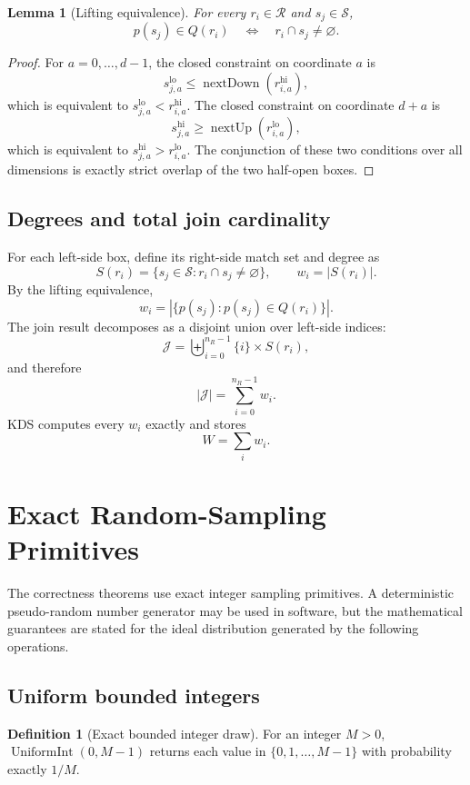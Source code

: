 \documentclass[11pt]{article}
\theoremstyle{definition}
\newtheorem{definition}{Definition}[section]
\theoremstyle{plain}
\newtheorem{lemma}{Lemma}[section]
\theoremstyle{remark}
\DeclareMathOperator{\nextUp}{nextUp}
\DeclareMathOperator{\nextDown}{nextDown}
\DeclareMathOperator{\UniformInt}{UniformInt}
\newcommand{\Rrel}{\mathcal R}
\newcommand{\Srel}{\mathcal S}
\newcommand{\Jset}{\mathcal J}
\newcommand{\lo}{\mathrm{lo}}
\newcommand{\hi}{\mathrm{hi}}
\begin{document}
\begin{lemma}[Lifting equivalence]
For every $r_i\in\Rrel$ and $s_j\in\Srel$,
\[
  p(s_j)\in Q(r_i)
  \quad\Longleftrightarrow\quad
  r_i\cap s_j\neq\varnothing.
\]
\end{lemma}

\begin{proof}
For $a=0,\ldots,d-1$, the closed constraint on coordinate $a$ is
\[
  s_{j,a}^{\lo}\le\nextDown(r_{i,a}^{\hi}),
\]
which is equivalent to $s_{j,a}^{\lo}<r_{i,a}^{\hi}$.  The closed constraint on coordinate
$d+a$ is
\[
  s_{j,a}^{\hi}\ge\nextUp(r_{i,a}^{\lo}),
\]
which is equivalent to $s_{j,a}^{\hi}>r_{i,a}^{\lo}$.  The conjunction of these two
conditions over all dimensions is exactly strict overlap of the two half-open boxes.
\end{proof}

\subsection{Degrees and total join cardinality}

For each left-side box, define its right-side match set and degree as
\[
  S(r_i) = \{s_j\in\Srel : r_i\cap s_j\neq\varnothing\},
  \qquad
  w_i = |S(r_i)|.
\]
By the lifting equivalence,
\[
  w_i = |\{p(s_j):p(s_j)\in Q(r_i)\}|.
\]
The join result decomposes as a disjoint union over left-side indices:
\[
  \Jset = \biguplus_{i=0}^{n_R-1}\{i\}\times S(r_i),
\]
and therefore
\[
  |\Jset| = \sum_{i=0}^{n_R-1} w_i.
\]
KDS computes every $w_i$ exactly and stores
\[
  W = \sum_i w_i.
\]

\section{Exact Random-Sampling Primitives}

The correctness theorems use exact integer sampling primitives.  A deterministic pseudo-random
number generator may be used in software, but the mathematical guarantees are stated for the
ideal distribution generated by the following operations.

\subsection{Uniform bounded integers}

\begin{definition}[Exact bounded integer draw]
For an integer $M>0$, $\UniformInt(0,M-1)$ returns each value in
$\{0,1,\ldots,M-1\}$ with probability exactly $1/M$.
\end{definition}
\end{document}
